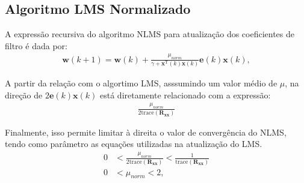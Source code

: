 



\clearpage


\subsection{Algoritmo LMS Normalizado} %
A expressão recursiva do algoritmo NLMS para atualização dos coeficientes de filtro é dada por:
\begin{align*}
    \mathbf{w}(k+1) = \mathbf{w}(k) + \frac{\mu_{norm}}{\gamma + \mathbf{x}^{\text{T}}(k) \mathbf{x}(k)} \mathbf{e}(k) \mathbf{x}(k),
\end{align*}

A partir da relação com o algortimo LMS, asssumindo um valor médio de $\mu$, na direção de $2 \mathbf{e}(k) \mathbf{x}(k)$ está diretamente relacionado com a expressão: 
\begin{align*}
    \frac{\mu_{norm}}{2 \text{trace}(\mathbf{R_{xx}})}
\end{align*}

Finalmente, isso permite limitar à direita o valor de convergência do NLMS, tendo como parâmetro as equações utilizadas na atualização do LMS.
\begin{align*}
    0 &< \frac{\mu_{norm}}{2 \text{trace}(\mathbf{R_{xx}})} < \frac{1}{\text{trace}(\mathbf{R_{xx}})} \\
    0 &< \mu_{norm} < 2, 
\end{align*}
        

